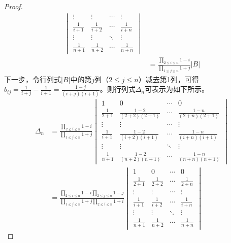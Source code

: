 \begin{proof}
\begin{equation}
\begin{split}
\begin{vmatrix}
    \vdots & \vdots & \cdots & \vdots \\
    \frac{1}{i+1} & \frac{1}{i+2} & \cdots & \frac{1}{i+n} \\
    \vdots & \vdots & \ddots & \vdots \\
    \frac{1}{n+1} & \frac{1}{n+2} & \cdots & \frac{1}{n+n}
    \end{vmatrix}\\
    & = \frac{\prod\limits_{2\leq i \leq n}{1-i}}{\prod\limits_{1\leq j \leq n}{1+j}}
    \left\vert B \right\vert
\end{split}
\end{equation}
下一步，令行列式$\left\vert B \right\vert$中的第$j$列（$2 \leq j \leq n$）减去第1列，可得$b_{ij} = \frac{1}{i+j} - \frac{1}{i+1}=\frac{1-j}{\left(i+j\right)\left(i+1\right)}$。则行列式$\Delta_n$可表示为如下所示。
\begin{equation}\label{eq:detetminant3}
\begin{split}
    \Delta_n & = \frac{\prod\limits_{2\leq i \leq n}{1-i}}{\prod\limits_{1\leq j \leq n}{1+j}}
    \begin{vmatrix}
    1 & 0 & \cdots & 0 \\
    \frac{1}{2+1} & \frac{1-2}{\left(2+2\right)\left(2+1\right)} & \cdots & \frac{1-n}{\left(2+n\right)\left(2+1\right)} \\
    \vdots & \vdots & \cdots & \vdots \\
    \frac{1}{i+1} & \frac{1-2}{\left(i+2\right)\left(i+1\right)} & \cdots & \frac{1-n}{\left(i+n\right)\left(i+1\right)} \\
    \vdots & \vdots & \ddots & \vdots \\
    \frac{1}{n+1} & \frac{1-2}{\left(n+2\right)\left(n+1\right)} & \cdots & \frac{1-n}{\left(n+n\right)\left(n+1\right)}
    \end{vmatrix}\\
    & = \frac{\prod\limits_{2\leq i \leq n}{1-i}\prod\limits_{2\leq j \leq n}{1-j}}{\prod\limits_{1\leq j \leq n}{1+j}\prod\limits_{2\leq i \leq n}{1+i}}
    \begin{vmatrix}
    1 & 0 & \cdots & 0 \\
    \frac{1}{2+1} & \frac{1}{2+2} & \cdots & \frac{1}{2+n}\\
    \vdots & \vdots & \cdots & \vdots \\
    \frac{1}{i+1} & \frac{1}{i+2} & \cdots & \frac{1}{i+n}\\
    \vdots & \vdots & \ddots & \vdots \\
    \frac{1}{n+1} & \frac{1}{n+2} & \cdots & \frac{1}{n+n}

\end{vmatrix}
\end{split}
\end{equation}
\end{proof}
